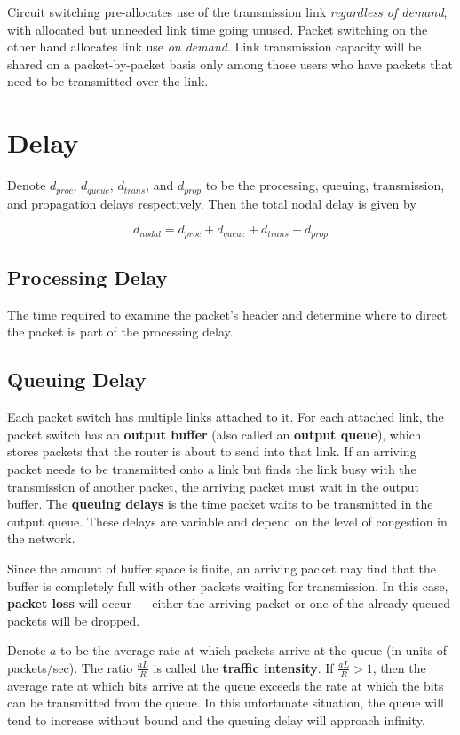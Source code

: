 \documentclass[11pt]{article}
\begin{document}
Circuit switching pre-allocates use of the transmission link \textit{regardless of demand}, with allocated but unneeded link time going unused. Packet switching on the other hand allocates link use \textit{on demand}. Link transmission capacity will be shared on a packet-by-packet basis only among those users who have packets that need to be transmitted over the link.

\section{Delay}

Denote $d_{proc}$, $d_{queue}$, $d_{trans}$, and $d_{prop}$ to be the processing, queuing, transmission, and propagation delays respectively. Then the total nodal delay is given by

\[
	d_{nodal} = d_{proc} + d_{queue} + d_{trans} + d_{prop}
\]

\subsection{Processing Delay}

The time required to examine the packet’s header and determine where to direct the packet is part of the processing delay.

\subsection{Queuing Delay}

Each packet switch has multiple links attached to it. For each attached link, the packet switch has an \textbf{output buffer} (also called an \textbf{output queue}), which stores packets that the router is about to send into that link. If an arriving packet needs to be transmitted onto a link but finds the link busy with the transmission of another packet, the arriving packet must wait in the output buffer. The \textbf{queuing delays} is the time packet waits to be transmitted in the output queue. These delays are variable and depend on the level of congestion in the network. 

Since the amount of buffer space is finite, an arriving packet may find that the buffer is completely full with other packets waiting for transmission. In this case, \textbf{packet loss} will occur --- either the arriving packet or one of the already-queued packets will be dropped.

Denote $a$ to be the average rate at which packets arrive at the queue (in units of packets/sec). The ratio $\frac{aL}{R}$ is called the \textbf{traffic intensity}. If  $\frac{aL}{R} > 1$, then the average rate at which bits arrive at the queue exceeds the rate at which the bits can be transmitted from the queue. In this unfortunate situation, the queue will tend to increase without bound and the queuing delay will approach infinity.
\end{document}
